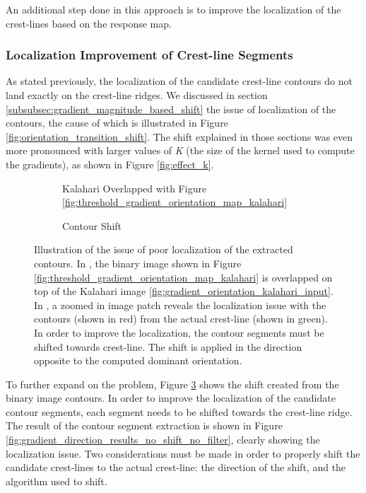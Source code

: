 An additional step done in this approach is to improve the localization of the crest-lines based on the response map.

\subsubsection{Localization Improvement of Crest-line Segments}

As stated previously, the localization of the candidate crest-line contours do not land exactly on the crest-line ridges. We discussed in section \ref{subsubsec:gradient_magnitude_based_shift} the issue of localization of the contours, the cause of which is illustrated in Figure \ref{fig:orientation_transition_shift}. The shift explained in those sections was even more pronounced with larger values of \emph{K} (the size of the kernel used to compute the gradients), as shown in Figure \ref{fig:effect_k}. 

\begin{figure}
	\centering
	\begin{subfigure}{0.48\textwidth}
		\centering
		\caption{Kalahari Overlapped with Figure \ref{fig:threshold_gradient_orientation_map_kalahari}}
		\label{fig:kalahari_shift_overlap}
	\end{subfigure}
	\begin{subfigure}{0.48\textwidth}
		\centering
		\caption{ Contour Shift }
		\label{fig:contour_location_shift}
	\end{subfigure}
	\caption{ Illustration of the issue of poor localization of the extracted contours. In , the binary image shown in Figure \ref{fig:threshold_gradient_orientation_map_kalahari} is overlapped on top of the Kalahari image \ref{fig:gradient_orientation_kalahari_input}. In , a zoomed in image patch reveals the localization issue with the contours (shown in red) from the actual crest-line (shown in green). In order to improve the localization, the contour segments must be shifted towards crest-line. The shift is applied in the direction opposite to the computed dominant orientation. }
	\label{fig:shifting_contours_to_crest_lines}
\end{figure}

To further expand on the problem, Figure \ref{fig:shifting_contours_to_crest_lines} shows the shift created from the binary image contours. In order to improve the localization of the candidate contour segments, each segment needs to be shifted towards the crest-line ridge. The result of the contour segment extraction is shown in Figure \ref{fig:gradient_direction_results_no_shift_no_filter}, clearly showing the localization issue. Two considerations must be made in order to properly shift the candidate crest-lines to the actual crest-line: the direction of the shift, and the algorithm used to shift.

